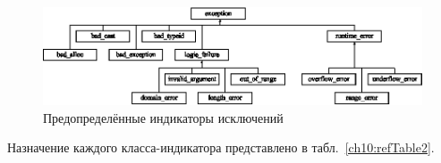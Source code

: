 \begin{figure}[htb]
\begin{center}
\includegraphics[width=\textwidth]{img/ris_10_5}
\caption{Предопределённые индикаторы исключений}
\label{ch10:refDrawing4}
\end{center}
\end{figure}

Назначение каждого класса-индикатора представлено в табл.~\ref{ch10:refTable2}.

